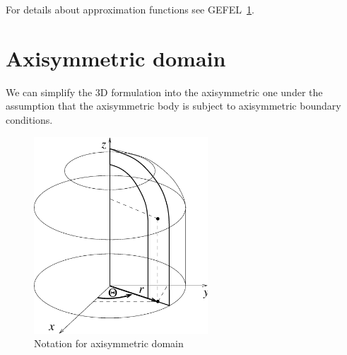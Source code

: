 For details about approximation functions see GEFEL~\ref{}.

\section{Axisymmetric domain}

We can simplify the 3D formulation into the axisymmetric one under the assumption that the axisymmetric body 
is subject to axisymmetric boundary conditions.

\begin{figure}[h!]
\begin{center}
\includegraphics[angle=0, width=6.5cm]{PS/note_axisym.eps}
\caption{Notation for axisymmetric domain}
\label{axisym}
\end{center}
\end{figure}

